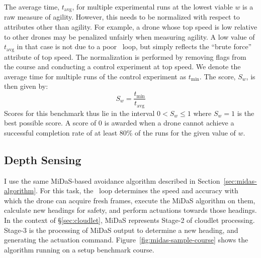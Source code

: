 The average time, $t_{\text{avg}}$, for multiple experimental runs at
the lowest viable $w$ is a raw measure of agility.  However, this needs
to be normalized with respect to attributes other than agility.
For example, a drone whose top speed is low relative to other drones
may be penalized unfairly when measuring agility.  A low value of
$t_{\text{avg}}$ in that case is not due to a poor \ooda~loop, but
simply reflects the ``brute force'' attribute of top speed.  The
normalization is performed by removing flags from the course and
conducting a control experiment at top speed.  We denote the average
time for multiple runs of the control experiment as $t_{\text{min}}$.
The score, $S_w$, is then given by:
\begin{equation}
	S_w = \frac{t_{\text{min}}}{t_{\text{avg}}}\label{eq:1}
\end{equation}
Scores for this benchmark thus lie in the interval $0 < S_w \leq 1$
where $S_w = 1$ is the best possible score. A score of 0 is awarded
when a drone cannot achieve a successful completion rate of at least
80\% of the runs for the given value of $w$.

\subsection{Depth Sensing}
\label{sec:midas}

I use the same MiDaS-based avoidance algorithm described in Section~\ref{sec:midas-algorithm}. For this task, the \ooda~loop determines the speed and accuracy with which the drone can acquire fresh frames, execute the MiDaS algorithm on them, calculate new headings for safety, and perform actuations towards those headings.  In the context of \S\ref{sec:cloudlet}, MiDaS represents Stage-2 of cloudlet processing.  Stage-3 is the processing of MiDaS output to determine a new heading, and generating the actuation command. Figure~\ref{fig:midas-sample-course} shows the algorithm running on a setup benchmark course.

